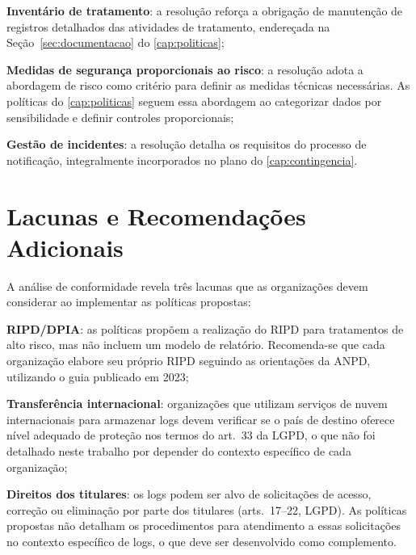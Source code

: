 \begin{alineas}
    \item \textbf{Inventário de tratamento}: a resolução reforça a obrigação de manutenção de registros detalhados das atividades de tratamento, endereçada na Seção~\ref{sec:documentacao} do \autoref{cap:politicas};
    \item \textbf{Medidas de segurança proporcionais ao risco}: a resolução adota a abordagem de risco como critério para definir as medidas técnicas necessárias. As políticas do \autoref{cap:politicas} seguem essa abordagem ao categorizar dados por sensibilidade e definir controles proporcionais;
    \item \textbf{Gestão de incidentes}: a resolução detalha os requisitos do processo de notificação, integralmente incorporados no plano do \autoref{cap:contingencia}.
\end{alineas}

\section{Lacunas e Recomendações Adicionais}
\label{sec:lacunas}

A análise de conformidade revela três lacunas que as organizações devem considerar ao implementar as políticas propostas:

\begin{alineas}
    \item \textbf{RIPD/DPIA}: as políticas propõem a realização do RIPD para tratamentos de alto risco, mas não incluem um modelo de relatório. Recomenda-se que cada organização elabore seu próprio RIPD seguindo as orientações da ANPD, utilizando o guia publicado em 2023;
    \item \textbf{Transferência internacional}: organizações que utilizam serviços de nuvem internacionais para armazenar logs devem verificar se o país de destino oferece nível adequado de proteção nos termos do art.\ 33 da LGPD, o que não foi detalhado neste trabalho por depender do contexto específico de cada organização;
    \item \textbf{Direitos dos titulares}: os logs podem ser alvo de solicitações de acesso, correção ou eliminação por parte dos titulares (arts.\ 17--22, LGPD). As políticas propostas não detalham os procedimentos para atendimento a essas solicitações no contexto específico de logs, o que deve ser desenvolvido como complemento.
\end{alineas}